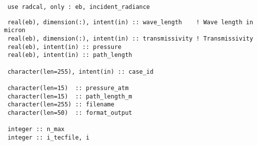 \begin{lstlisting}
 use radcal, only : eb, incident_radiance
\end{lstlisting}


\begin{lstlisting}
 real(eb), dimension(:), intent(in) :: wave_length    ! Wave length in micron
 real(eb), dimension(:), intent(in) :: transmissivity ! Transmissivity
 real(eb), intent(in) :: pressure
 real(eb), intent(in) :: path_length

 character(len=255), intent(in) :: case_id

 character(len=15)  :: pressure_atm
 character(len=15)  :: path_length_m
 character(len=255) :: filename
 character(len=50)  :: format_output

 integer :: n_max
 integer :: i_tecfile, i
\end{lstlisting}
